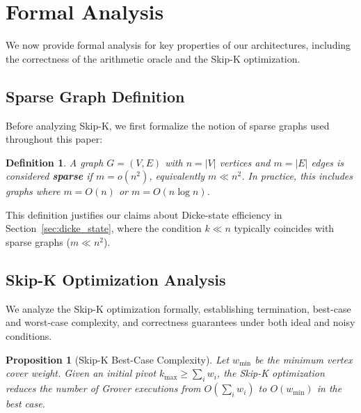 \documentclass{ieeeaccess}
\newtheorem{prop}{Proposition}
\newtheorem{dfin}{Definition}
\begin{document}
\section{Formal Analysis}
\label{sec:formal_analysis}

We now provide formal analysis for key properties of our
architectures, including the correctness of the arithmetic
oracle and the Skip-K optimization.

\subsection{Sparse Graph Definition}

Before analyzing Skip-K, we first formalize the notion of
sparse graphs used throughout this paper:

\begin{dfin}
\label{def:sparse}
A graph $G = (V,E)$ with $n = |V|$ vertices and $m = |E|$
edges is considered \textbf{sparse} if $m = o(n^2)$,
equivalently $m \ll n^2$. In practice, this includes graphs
where $m = O(n)$ or $m = O(n \log n)$.
\end{dfin}

This definition justifies our claims about Dicke-state
efficiency in Section~\ref{sec:dicke_state}, where the
condition $k \ll n$ typically coincides with sparse graphs
($m \ll n^2$).

\subsection{Skip-K Optimization Analysis}
\label{sec:skipk_analysis}

We analyze the Skip-K optimization formally, establishing
termination, best-case and worst-case complexity, and
correctness guarantees under both ideal and noisy conditions.

\begin{prop}[Skip-K Best-Case Complexity]
\label{theo:skipk}
Let $w_{\min}$ be the minimum vertex cover weight. Given an
initial pivot $k_{\max} \geq \sum_i w_i$, the Skip-K
optimization reduces the number of Grover executions from
$O(\sum_i w_i)$ to $O(w_{\min})$ in the best case.
\end{prop}
\end{document}
